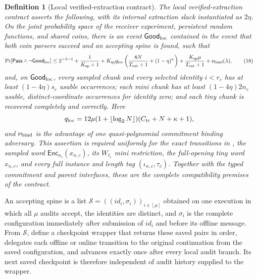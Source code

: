 \documentclass[11pt]{article}
\newtheorem{definition}[lemma]{Definition}
\begin{document}
\begin{definition}[Local verified-extraction contract]
The local verified-extraction contract asserts the following, with its
internal extraction slack instantiated as $2\eta$.  On the joint
probability space of the receiver experiment, persistent random functions, and
shared coins, there is an event $\mathsf{Good}_{\rm loc}$ contained in the
event that both coin parsers succeed and an accepting spine is found, such that
\[
 \Pr[\mathsf{Pass}\wedge\neg\mathsf{Good}_{\rm loc}]
 \le 2^{-\lambda-1}+\frac1{K_{\rm sp}+1}
 +K_{\rm sp}q_{\rm loc}
 \left(\frac{8N}{T_{\rm ext}+1}+(1-\eta)^\kappa\right)
 +\frac{K_{\rm sp}\mu}{T_{\rm ext}+1}
 +\nu_{\rm bind}(\lambda),
\tag{18}\label{eq:local-tail}
\]
and, on $\mathsf{Good}_{\rm loc}$, every sampled chunk and every selected
identity $i<r_c$ has at least
$(1-4\eta)s_c$ usable occurrences; each mini chunk has at least
$(1-4\eta)2n_c$ usable, distinct-coordinate occurrences for identity zero;
and each tiny chunk is recovered completely and correctly.  Here
\[
 q_{\rm loc}=12\mu(1+\lfloor\log_2N\rfloor)
 (C_{\rm tr}+N+\kappa+1),
\]
and $\nu_{\rm bind}$ is the advantage of one quasi-polynomial commitment
binding adversary.  This assertion is required uniformly for the exact
transitions in , the
sampled word $\mathsf{Enc}_{n_c}(x_{n,c})$, its $W_{\ell_c}$ mini restriction,
the full-opening tiny word $x_{n,c}$, and every full instance and length tag
$(\iota_{n,c},\tau_c)$.  Together with the typed commitment and parent
interfaces, these are the complete compatibility premises of the contract.
\end{definition}

An accepting spine is a list
$\mathcal S=((\mathit{id}_i,\sigma_i))_{i\in[\mu]}$ obtained on one execution
in which all $\mu$ audits accept, the identities are distinct, and
$\sigma_i$ is the complete configuration immediately after submission of
$\mathit{id}_i$ and before its offline message.  From $\mathcal S$, define a
checkpoint wrapper that returns these saved pairs in order, delegates each
offline or online transition to the original continuation from the saved
configuration, and advances exactly once after every local audit branch.  Its
next saved checkpoint is therefore independent of audit history supplied to
the wrapper.
\end{document}
